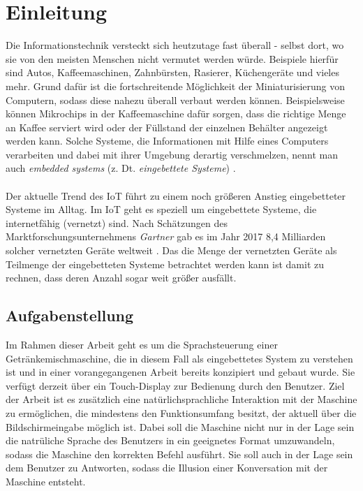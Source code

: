 \chapter{Einleitung}
Die Informationstechnik versteckt sich heutzutage fast überall - selbst dort, wo sie von den meisten Menschen nicht vermutet werden würde. Beispiele hierfür sind Autos, Kaffeemaschinen, Zahnbürsten, Rasierer, Küchengeräte und vieles mehr. Grund dafür ist die fortschreitende Möglichkeit der Miniaturisierung von Computern, sodass diese nahezu überall verbaut werden können. Beispielsweise können Mikrochips in der Kaffeemaschine dafür sorgen, dass die richtige Menge an Kaffee serviert wird oder der Füllstand der einzelnen Behälter angezeigt werden kann. Solche Systeme, die Informationen mit Hilfe eines Computers verarbeiten und dabei mit ihrer Umgebung derartig \glqq{}verschmelzen\grqq{}, nennt man auch \textit{embedded systems} (z. Dt. \textit{eingebettete Systeme}) \cite{marwedel_eingebettete_2021}.\\\\
Der aktuelle Trend des \ac{IoT} führt zu einem noch größeren Anstieg eingebetteter Systeme im Alltag. Im \ac{IoT} geht es speziell um eingebettete Systeme, die internetfähig (vernetzt) sind. Nach Schätzungen des Marktforschungsunternehmens \textit{Gartner} gab es im Jahr 2017 8,4 Milliarden solcher vernetzten Geräte weltweit \cite{jansen_digitalisierung_2017}. Das die Menge der vernetzten Geräte als Teilmenge der eingebetteten Systeme betrachtet werden kann ist damit zu rechnen, dass deren Anzahl sogar weit größer ausfällt.

\section{Aufgabenstellung}
Im Rahmen dieser Arbeit geht es um die Sprachsteuerung einer Getränkemischmaschine, die in diesem Fall als eingebettetes System zu verstehen ist und in einer vorangegangenen Arbeit bereits konzipiert und gebaut wurde. Sie verfügt derzeit über ein Touch-Display zur Bedienung durch den Benutzer. Ziel der Arbeit ist es zusätzlich eine natürlichsprachliche Interaktion mit der Maschine zu ermöglichen, die mindestens den Funktionsumfang besitzt, der aktuell über die Bildschirmeingabe möglich ist. Dabei soll die Maschine nicht nur in der Lage sein die natrüliche Sprache des Benutzers in ein geeignetes Format umzuwandeln, sodass die Maschine den korrekten Befehl ausführt. Sie soll auch in der Lage sein dem Benutzer zu Antworten, sodass die Illusion einer Konversation mit der Maschine entsteht.

